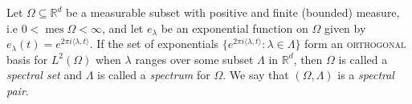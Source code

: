 \documentclass[../thesis.tex]{subfiles}
\begin{document}





\begin{definition} \label{def:spectral_set}
    Let $\Omega \subseteq \mathbb{R}^d$ be a measurable subset with positive and finite (bounded) measure, i.e $0< \operatorname{mes} \Omega < \infty$, and let $e_{\lambda}$ be an exponential function on $\Omega$ given by $e_{\lambda}(t) = e^{2\pi i \langle \lambda,t  \rangle }$. If the set of exponentials $\{ e^{2\pi i \langle \lambda,t  \rangle } : \lambda \in \Lambda\}$  form an \textsc{orthogonal} basis for $L^2 (\Omega)$ when $\lambda$ ranges over some subset $\Lambda$ in $\mathbb{R}^d$, then $\Omega$ is called a \emph{spectral set} and $\Lambda$ is called a \emph{spectrum} for $\Omega$. We say that $(\Omega, \Lambda)$ is a \emph{spectral pair}. 
\end{definition} 






\end{document}
